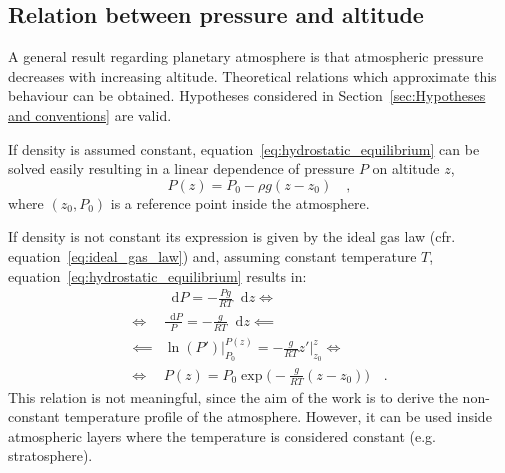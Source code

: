\documentclass[a4paper,10pt,draft,twocolumn]{article}
\newcommand{\dd}{\mathop{}\!\mathrm{d}}
\begin{document}
\subsection{Relation between pressure and altitude}
\label{sec:Relation between pressure and altitude}
A general result regarding planetary atmosphere is that atmospheric pressure decreases with increasing altitude. Theoretical relations which approximate this behaviour can be obtained. Hypotheses considered in Section~\ref{sec:Hypotheses and conventions} are valid.

If density is assumed constant, equation~\eqref{eq:hydrostatic_equilibrium} can be solved easily resulting in a linear dependence of pressure $P$ on altitude $z$, %
\begin{equation}
  \label{eq:pressure_constant_density}
  P(z) = P_0 - \rho g (z - z_0)
  \quad ,
\end{equation}
where $(z_0, P_0)$ is a reference point inside the atmosphere.

If density is not constant its expression is given by the ideal gas law (cfr. equation~\eqref{eq:ideal_gas_law}) and, assuming constant temperature $T$, equation~\eqref{eq:hydrostatic_equilibrium} results in:
\begin{equation}
  \label{eq:pressure_constant_temperature}
  \begin{split}
    & \dd P = - \frac{P g}{R T} \dd z \iff \\
    \iff & \frac{\dd P}{P} = - \frac{g}{R T} \dd z \impliedby \\
    \impliedby & \ln(P') \bigg|_{P_0}^{P(z)} = - \frac{g}{R T} z' \bigg|_{z_0}^{z} \iff \\
    \iff & P(z) = P_0 \exp{\bigg( - \frac{g}{R T} (z - z_0) \bigg)}
    \quad .
  \end{split}
\end{equation}
This relation is not meaningful, since the aim of the work is to derive the non-constant temperature profile of the atmosphere. However, it can be used inside atmospheric layers where the temperature is considered constant (e.g. stratosphere).
\end{document}
